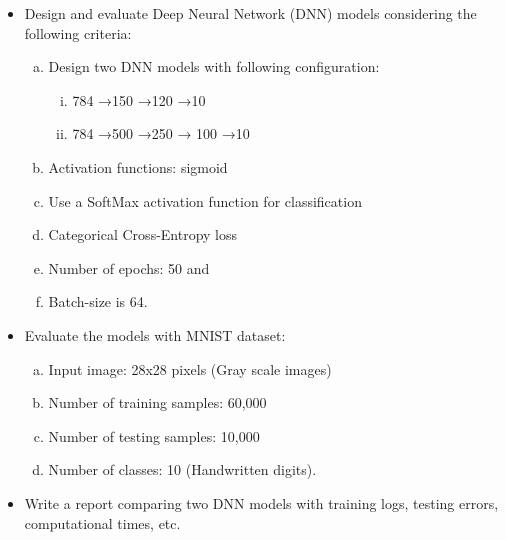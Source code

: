 \documentclass[12pt,oneside,geqno]{article}
\begin{document}
	
	\begin{Problem}[b]
		
		\begin{itemize}
			
			\item Design and evaluate Deep Neural Network (DNN) models considering the following criteria:
			
			\begin{enumerate}[a)]
				
				\item Design two DNN models with following configuration:
				
				\begin{enumerate}[i)]
					
					\item 784 →150 →120 →10
					\item 784 →500 →250 → 100 →10
					
				\end{enumerate}
				
				\item Activation functions: sigmoid
				
				\item Use a SoftMax activation function for classification
				
				\item Categorical Cross-Entropy loss
				
				\item Number of epochs: 50 and
				
				\item Batch-size is 64.
				
			\end{enumerate}
			
			
			
			\item Evaluate the models with MNIST dataset:
			
			\begin{enumerate}[a)]
				\item Input image: 28x28 pixels (Gray scale images)
				
				\item Number of training samples: 60,000
				
				\item Number of testing samples: 10,000
				
				\item Number of classes: 10 (Handwritten digits).
				
			\end{enumerate}
			
			\item Write a report comparing two DNN models with training logs, testing errors, computational times, etc. 
		\end{itemize}
		
	\end{Problem}
	
\end{document}
